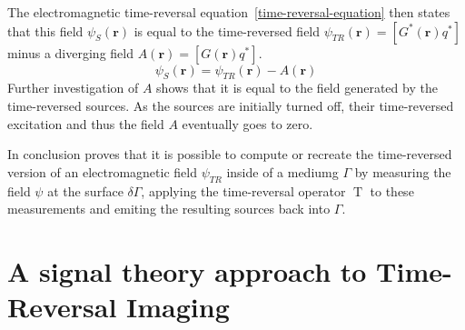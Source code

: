 The electromagnetic time-reversal equation~\eqref{time-reversal-equation} then states that this field \(\psi_S(\mathbf{r})\) is equal to the time-reversed field \(\psi_{TR}(\mathbf{r}) = [G^*(\mathbf{r}) q^*]\) minus a diverging field \(A(\mathbf{r}) = [G(\mathbf{r}) q^*]\).
\begin{equation}
    \psi_S(\mathbf{r}) = \psi_{TR}(\mathbf{r}) - A(\mathbf{r})
\end{equation}
Further investigation of \(A\) shows that it is equal to the field generated by the time-reversed sources.
As the sources are initially turned off, their time-reversed excitation and thus the field \(A\) eventually goes to zero.

In conclusion \parencite{de_rosny_theory_2010} proves that it is possible to compute or recreate the time-reversed version of an electromagnetic field \(\psi_{TR}\) inside of a mediumg \(\Gamma \) by measuring the field \(\psi \) at the surface \(\delta \Gamma \), applying the time-reversal operator \(\operatorname{T}\) to these measurements and emiting the resulting sources back into \(\Gamma \).



\section{A signal theory approach to Time-Reversal Imaging}

